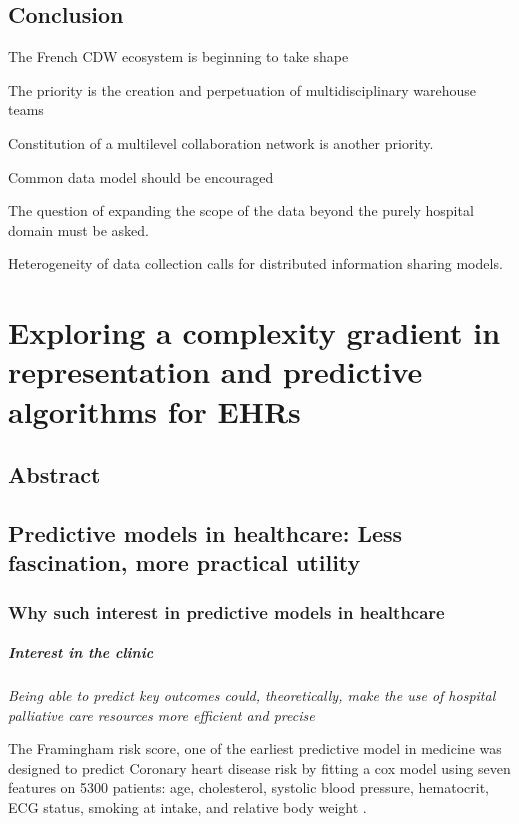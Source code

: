 \documentclass{report}
\begin{document}
\section{Conclusion}\label{sec:cdw:conclusion}

The French CDW ecosystem is beginning to take shape

The priority is the creation and perpetuation of multidisciplinary warehouse teams

Constitution of a multilevel collaboration network is another priority.

Common data model should be encouraged

The question of expanding the scope of the data beyond the purely hospital domain must be asked.

Heterogeneity of data collection calls for distributed information sharing models.

\chapter{Exploring a complexity gradient in representation and predictive algorithms for EHRs}\label{chapter:predictive_models}
\section{Abstract}\label{sec:predictive_models:abstract}

\section{Predictive models in healthcare: Less fascination, more practical utility}\label{sec:predictive_models:motivation}

\subsection{Why such interest in predictive models in healthcare}\label{subsec:predictive_models:importance}

\paragraph{Interest in the clinic}

\textit{Being able to predict key outcomes could, theoretically, make the use of
  hospital palliative care resources more efficient and precise} \citep{topol2019high}

The Framingham risk score, one of the earliest predictive model in medicine was
designed to predict Coronary heart disease risk by fitting a cox model using
seven features on 5300 patients: age, cholesterol, systolic blood pressure,
hematocrit, ECG status, smoking at intake, and relative body weight
\citep{brand1976multivariate}.
\end{document}
